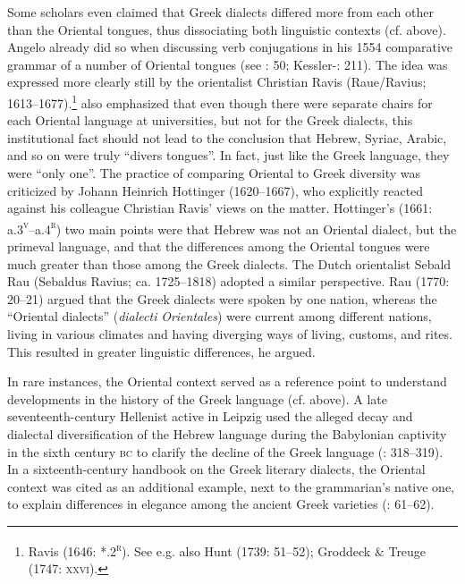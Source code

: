 \documentclass[output=paper]{langsci/langscibook}
\begin{document}
Some scholars even claimed that Greek dialects differed more from each other than the Oriental tongues, thus dissociating both linguistic contexts (cf.  above). Angelo \citet[34]{Canini1554} already did so when discussing verb conjugations in his 1554 comparative grammar of a number of Oriental tongues (see \citealt{Contini1994}: 50; Kessler-\citealt{Mesguich2013}: 211). The idea was expressed more clearly still by the orientalist Christian Ravis (Raue/Ravius; 1613–1677).\footnote{Ravis (1646: *.2\textsc{\textsuperscript{r}}). See e.g. also Hunt (1739: 51–52); Groddeck \& Treuge (1747: \textsc{xxvi}).} \citet[48]{Ravis1650} also emphasized that even though there were separate chairs for each Oriental language at universities, but not for the Greek dialects, this institutional fact should not lead to the conclusion that Hebrew, Syriac, Arabic, and so on were truly “divers tongues”. In fact, just like the Greek language, they were “only one”. The practice of comparing Oriental to Greek diversity was criticized by Johann Heinrich Hottinger (1620–1667), who explicitly reacted against his colleague Christian Ravis’ views on the matter. Hottinger’s (1661: a.3\textsc{\textsuperscript{v}}–a.4\textsc{\textsuperscript{r}}) two main points were that Hebrew was not an Oriental dialect, but the primeval language, and that the differences among the Oriental tongues were much greater than those among the Greek dialects. The Dutch orientalist Sebald Rau (Sebaldus Ravius; ca. 1725–1818) adopted a similar perspective. Rau (1770: 20–21) argued that the Greek dialects were spoken by one nation, whereas the “Oriental dialects” (\textit{dialecti} \textit{Orientales}) were current among different nations, living in various climates and having diverging ways of living, customs, and rites. This resulted in greater linguistic differences, he argued.

In rare instances, the Oriental context served as a reference point to understand developments in the history of the Greek language (cf.  above). A late seventeenth-century Hellenist active in Leipzig used the alleged decay and dialectal diversification of the Hebrew language during the Babylonian captivity in the sixth century \textsc{bc} to clarify the decline of the Greek language (\citealt{Eling1691}: 318–319). In a sixteenth-century handbook on the Greek literary dialects, the Oriental context was cited as an additional example, next to the grammarian’s native one, to explain differences in elegance among the ancient Greek varieties (\citealt{Walper1589}: 61–62).
\end{document}
